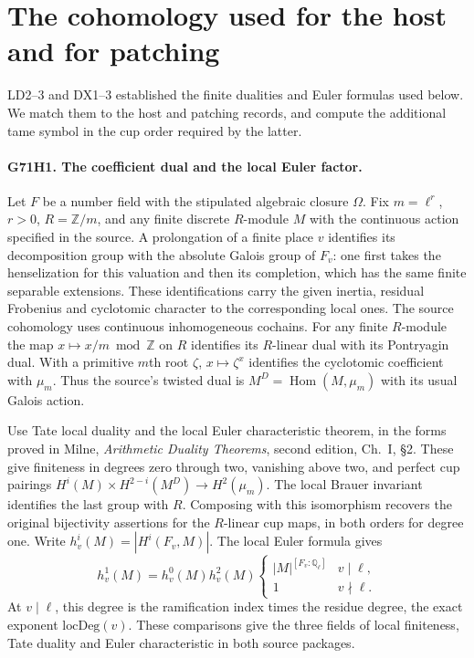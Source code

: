 \section{The cohomology used for the host and for patching}

LD2--3 and DX1--3 established the finite dualities and Euler
formulas used below. We match them to the host and patching
records, and compute the additional tame symbol in the cup order
required by the latter.

\paragraph{G71H1. The coefficient dual and the local Euler factor.}
Let $F$ be a number field with the stipulated algebraic closure
$\Omega$. Fix $m=\ell^r$, $r>0$, $R=\mathbb Z/m$, and any finite
discrete $R$-module $M$ with the continuous action specified in
the source. A prolongation of a finite place $v$ identifies its
decomposition group with the absolute Galois group of $F_v$:
one first takes the henselization for this valuation and then its
completion, which has the same finite separable extensions. These
identifications carry the given inertia, residual Frobenius and
cyclotomic character to the corresponding local ones. The source
cohomology uses continuous inhomogeneous cochains. For any finite
$R$-module the map $x\mapsto x/m\bmod\mathbb Z$ on $R$ identifies
its $R$-linear dual with its Pontryagin dual. With a primitive
$m$th root $\zeta$, $x\mapsto\zeta^x$ identifies the cyclotomic
coefficient with $\mu_m$. Thus the source's twisted dual is
$M^D=\operatorname{Hom}(M,\mu_m)$ with its usual Galois action.

Use Tate local duality and the local Euler characteristic theorem,
in the forms proved in Milne, \emph{Arithmetic Duality Theorems},
second edition, Ch.~I, \S2. These give finiteness in degrees
zero through two, vanishing above two, and perfect cup pairings
$H^i(M)\times H^{2-i}(M^D)\to H^2(\mu_m)$. The local Brauer
invariant identifies the last group with $R$. Composing with
this isomorphism recovers the original bijectivity assertions for
the $R$-linear cup maps, in both orders for degree one. Write
$h_v^i(M)=|H^i(F_v,M)|$. The local Euler formula gives
\[
 h_v^1(M)=h_v^0(M)h_v^2(M)
 \begin{cases} |M|^{[F_v:\mathbb Q_\ell]} &v\mid\ell,\\
 1 &v\nmid\ell .\end{cases}
\]
At $v\mid\ell$, this degree is the ramification index times the
residue degree, the exact exponent $\mathrm{locDeg}(v)$.
These comparisons give the three fields of local finiteness,
Tate duality and Euler characteristic in both source packages.

